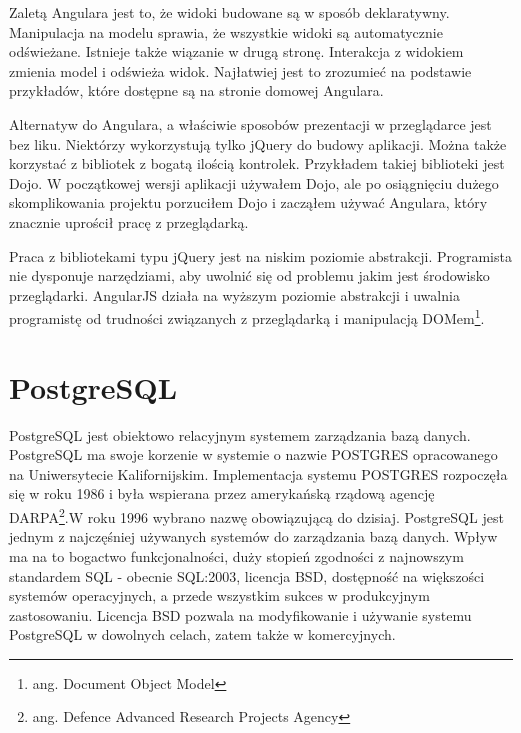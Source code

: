 \documentclass[a4paper,onecolumn,oneside,11pt,wide,floatssmall]{mwrep}
\theoremstyle{definition}
\theoremstyle{plain}%
\theoremstyle{remark}
\begin{document}
Zaletą Angulara jest to, że widoki budowane są w sposób deklaratywny. Manipulacja na modelu sprawia, że wszystkie widoki są automatycznie odświeżane. Istnieje także wiązanie w drugą stronę. Interakcja z widokiem zmienia model i odświeża widok. Najłatwiej jest to zrozumieć na podstawie przykładów, które dostępne są na stronie domowej Angulara.

Alternatyw do Angulara, a właściwie sposobów prezentacji w przeglądarce jest bez liku. Niektórzy wykorzystują tylko jQuery \cite{jqueryHome} do budowy aplikacji. Można także korzystać z bibliotek z bogatą ilością kontrolek. Przykładem takiej biblioteki jest Dojo. W początkowej wersji aplikacji używałem Dojo, ale po osiągnięciu dużego skomplikowania projektu porzuciłem Dojo i zacząłem używać Angulara, który znacznie uprościł pracę z przeglądarką.

Praca z bibliotekami typu jQuery jest na niskim poziomie abstrakcji. Programista nie dysponuje narzędziami, aby uwolnić się od problemu jakim jest środowisko przeglądarki. AngularJS działa na wyższym poziomie abstrakcji i uwalnia programistę od trudności związanych z przeglądarką i manipulacją DOMem\footnote{ang. Document Object Model}.

\section{PostgreSQL}
PostgreSQL \cite{postgreSQLHome} jest obiektowo relacyjnym systemem zarządzania bazą danych. PostgreSQL ma swoje korzenie w systemie o nazwie POSTGRES opracowanego na Uniwersytecie Kalifornijskim. Implementacja systemu POSTGRES rozpoczęła się w roku 1986 i była wspierana przez amerykańską rządową agencję DARPA\footnote{ang. Defence Advanced Research Projects Agency}.W roku 1996 wybrano nazwę obowiązującą do dzisiaj. PostgreSQL jest jednym z najczęśniej używanych systemów do zarządzania bazą danych. Wpływ ma na to bogactwo funkcjonalności, duży stopień zgodności z najnowszym standardem SQL - obecnie SQL:2003, licencja BSD, dostępność na większości systemów operacyjnych, a przede wszystkim sukces w produkcyjnym zastosowaniu. Licencja BSD pozwala na modyfikowanie i używanie systemu PostgreSQL w dowolnych celach, zatem także w komercyjnych.
\end{document}
